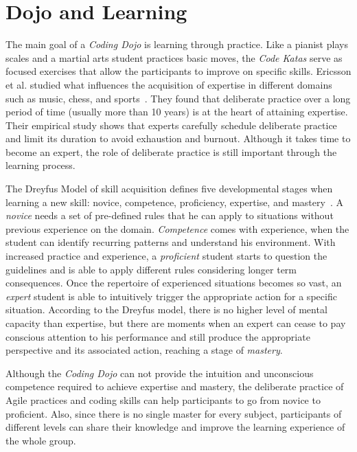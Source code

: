 \section{Dojo and Learning}\label{sec:learning}

The main goal of a \emph{Coding Dojo} is learning through practice. Like a pianist
plays scales and a martial arts student practices basic moves, the \emph{Code Katas}
serve as focused exercises that allow the participants to improve on specific skills.
Ericsson et al. studied what influences the acquisition of expertise in
different domains such as music, chess, and sports~\cite{DeliberatePractice}. They found
that deliberate practice over a long period of time (usually more than 10 years) is at the
heart of attaining expertise. Their empirical study shows that experts carefully schedule
deliberate practice and limit its duration to avoid exhaustion and burnout. Although it
takes time to become an expert, the role of deliberate practice is still important through
the learning process.

The Dreyfus Model of skill acquisition defines five developmental stages when learning
a new skill: novice, competence, proficiency, expertise, and mastery~\cite{Dreyfus}. A
\emph{novice} needs a set of pre-defined rules that he can apply to situations without
previous experience on the domain. \emph{Competence} comes with experience, when the student
can identify recurring patterns and understand his environment. With increased practice and
experience, a \emph{proficient} student starts to question the guidelines and is able to
apply different rules considering longer term consequences. Once the repertoire of
experienced situations becomes so vast, an \emph{expert} student is able to intuitively
trigger the appropriate action for a specific situation. According to the Dreyfus model,
there is no higher level of mental capacity than expertise, but there are moments when an
expert can cease to pay conscious attention to his performance and still produce the
appropriate perspective and its associated action, reaching a stage of \emph{mastery}.

Although the \emph{Coding Dojo} can not provide the intuition and unconscious competence
required to achieve expertise and mastery, the deliberate practice of Agile practices
and coding skills can help participants to go from novice to proficient. Also, since
there is no single master for every subject, participants of different levels can
share their knowledge and improve the learning experience of the whole group.

